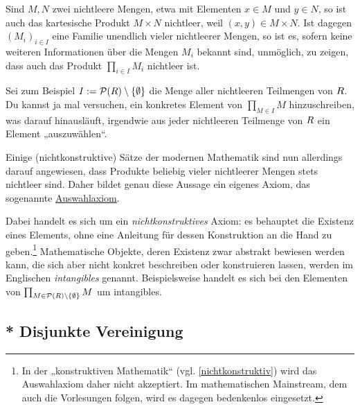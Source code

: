 \begin{vorschau}[* Auswahlaxiom] \label{auswahlaxiom}  
    Sind $M,N$ zwei nichtleere Mengen, etwa mit Elementen $x\in M$ und $y\in N$, so ist auch das kartesische Produkt $M\times N$ nichtleer, weil $(x,y)\in M\times N$. Ist dagegen $(M_i)_{i\in I}$ eine Familie unendlich vieler nichtleerer Mengen, so ist es, sofern keine weiteren Informationen über die Mengen $M_i$ bekannt sind, unmöglich, zu zeigen, dass auch das Produkt $\prod_{i\in I} M_i$ nichtleer ist.

    Sei zum Beispiel $I:= \mathcal P(\relax R)\setminus \{\emptyset\}$ die Menge aller nichtleeren Teilmengen von $\relax R$. Du kannst ja mal versuchen, ein konkretes Element von $\prod_{M\in I} M$ hinzuschreiben, was darauf hinausläuft, irgendwie aus jeder nichtleeren Teilmenge von $\relax R$ ein Element „auszuwählen“.

    Einige (nichtkonstruktive) Sätze der modernen Mathematik sind nun allerdings darauf angewiesen, dass Produkte beliebig vieler nichtleerer Mengen stets nichtleer sind. Daher bildet genau diese Aussage ein eigenes Axiom, das sogenannte \href{https://en.wikipedia.org/wiki/Axiom_of_choice}{Auswahlaxiom}.

    Dabei handelt es sich um ein \emph{nichtkonstruktives} Axiom: es behauptet die Existenz eines Elements, ohne eine Anleitung für dessen Konstruktion an die Hand zu geben.\footnote{In der „konstruktiven Mathematik“ (vgl. \cref{nichtkonstruktiv}) wird das Auswahlaxiom daher nicht akzeptiert. Im mathematischen Mainstream, dem auch die Vorlesungen folgen, wird es dagegen bedenkenlos eingesetzt.} Mathematische Objekte, deren Existenz zwar abstrakt bewiesen werden kann, die sich aber nicht konkret beschreiben oder konstruieren lassen, werden im Englischen \emph{intangibles} genannt. Beispielsweise handelt es sich bei den Elementen von $\prod_{M\in \mathcal P(\relax R)\setminus \{\emptyset\}} M$ um intangibles.
\end{vorschau}





\subsection*{* Disjunkte Vereinigung}


